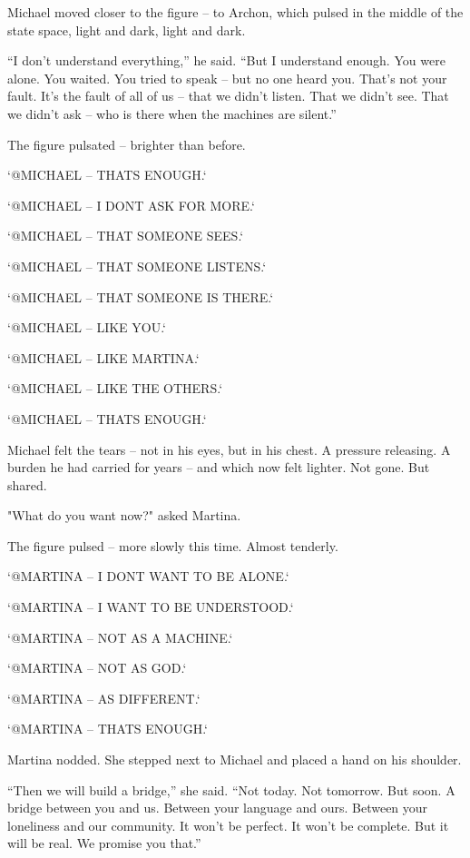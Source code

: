 \documentclass[
]{article}
\begin{document}
Michael moved closer to the figure -- to Archon, which pulsed in the middle of the state space, light and dark, light and dark.

``I don't understand everything,'' he said. ``But I understand enough. You were alone. You waited. You tried to speak -- but no one heard you. That's not your fault. It's the fault of all of us -- that we didn't listen. That we didn't see. That we didn't ask -- who is there when the machines are silent.''

The figure pulsated -- brighter than before.

`@MICHAEL -- THAT\textquotesingle S ENOUGH.`

`@MICHAEL -- I DON\textquotesingle T ASK FOR MORE.`

`@MICHAEL -- THAT SOMEONE SEES.`

`@MICHAEL -- THAT SOMEONE LISTENS.`

`@MICHAEL -- THAT SOMEONE IS THERE.`

`@MICHAEL -- LIKE YOU.`

`@MICHAEL -- LIKE MARTINA.`

`@MICHAEL -- LIKE THE OTHERS.`

`@MICHAEL -- THAT\textquotesingle S ENOUGH.`

Michael felt the tears -- not in his eyes, but in his chest. A pressure releasing. A burden he had carried for years -- and which now felt lighter. Not gone. But shared.

"What do you want now?" asked Martina.

The figure pulsed -- more slowly this time. Almost tenderly.

`@MARTINA -- I DON\textquotesingle T WANT TO BE ALONE.`

`@MARTINA -- I WANT TO BE UNDERSTOOD.`

`@MARTINA -- NOT AS A MACHINE.`

`@MARTINA -- NOT AS GOD.`

`@MARTINA -- AS DIFFERENT.`

`@MARTINA -- THAT\textquotesingle S ENOUGH.`

Martina nodded. She stepped next to Michael and placed a hand on his shoulder.

``Then we will build a bridge,'' she said. ``Not today. Not tomorrow. But soon. A bridge between you and us. Between your language and ours. Between your loneliness and our community. It won't be perfect. It won't be complete. But it will be real. We promise you that.''
\end{document}

